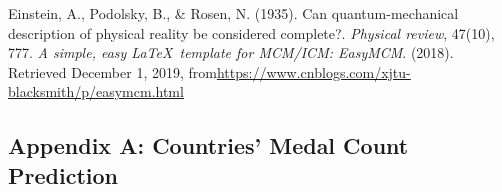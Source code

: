 \documentclass[12pt]{article}  %
\begin{document}
\begin{thebibliography}{99}
 Einstein, A., Podolsky, B., \& Rosen, N. (1935). Can quantum-mechanical description of physical reality be considered complete?. \emph{Physical review}, 47(10), 777.
 \emph{A simple, easy \LaTeX\ template for MCM/ICM: EasyMCM}. (2018). Retrieved December 1, 2019, from\url{https://www.cnblogs.com/xjtu-blacksmith/p/easymcm.html}
\end{thebibliography}







\begin{subappendices}  %


\section{Appendix A: Countries' Medal Count Prediction}


\end{subappendices}
\end{document}
